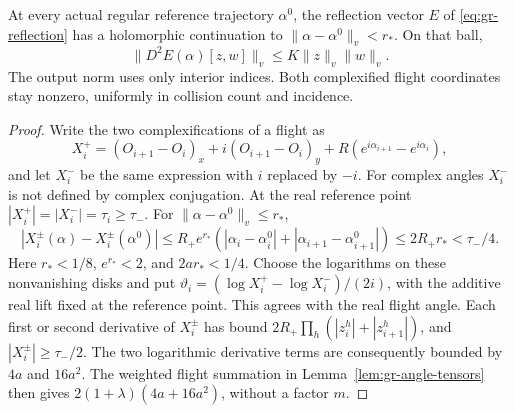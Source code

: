 \begin{lemma}
\label{lem:pt-complex}
At every actual regular reference trajectory $\alpha^0$, the reflection
vector $E$ of \eqref{eq:gr-reflection} has a holomorphic continuation to
$\|\alpha-\alpha^0\|_v<r_*$.  On that ball,
\[
 \|D^2E(\alpha)[z,w]\|_v\le K\|z\|_v\|w\|_v.
\]
The output norm uses only interior indices.  Both complexified flight
coordinates stay nonzero, uniformly in collision count and incidence.
\end{lemma}
\begin{proof}
Write the two complexifications of a flight as
\[
 X_i^+=(O_{i+1}-O_i)_x+i(O_{i+1}-O_i)_y
             +R(e^{i\alpha_{i+1}}-e^{i\alpha_i}),
\]
and let $X_i^-$ be the same expression with $i$ replaced by $-i$.
For complex angles $X_i^-$ is not defined by complex conjugation.
At the real reference point $|X_i^+|=|X_i^-|=\tau_i\ge\tau_-$.
For $\|\alpha-\alpha^0\|_v\le r_*$,
\[
 |X_i^\pm(\alpha)-X_i^\pm(\alpha^0)|
 \le R_+e^{r_*}(|\alpha_i-\alpha_i^0|
                      +|\alpha_{i+1}-\alpha_{i+1}^0|)
 \le2R_+r_*<\tau_-/4.
\]
Here $r_*<1/8$, $e^{r_*}<2$, and $2ar_*<1/4$.
Choose the logarithms on these nonvanishing disks and put
$\vartheta_i=(\log X_i^+-\log X_i^-)/(2i)$, with the additive
real lift fixed at the reference point.  This agrees with the real
flight angle.  Each first or second derivative of $X_i^\pm$ has
bound $2R_+\prod_h(|z_i^h|+|z_{i+1}^h|)$, and
$|X_i^\pm|\ge\tau_-/2$.  The two logarithmic derivative terms
are consequently bounded by $4a$ and $16a^2$.
The weighted flight summation in Lemma~\ref{lem:gr-angle-tensors}
then gives $2(1+\lambda)(4a+16a^2)$, without a factor $m$.
\end{proof}


